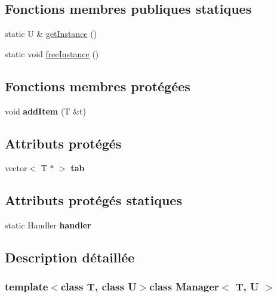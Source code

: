 \subsection*{Fonctions membres publiques statiques}
\begin{DoxyCompactItemize}
\item 
static U \& \hyperlink{class_manager_a8372e4f1e14f3605a57d839b152325ed}{get\+Instance} ()
\item 
static void \hyperlink{class_manager_ada15725fe33d625e2c06dcbe2c5edc4e}{free\+Instance} ()
\end{DoxyCompactItemize}
\subsection*{Fonctions membres protégées}
\begin{DoxyCompactItemize}
\item 
\hypertarget{class_manager_ada69ae9ca42784e98fb81b1fdbcfc6a6}{}void {\bfseries add\+Item} (T \&t)\label{class_manager_ada69ae9ca42784e98fb81b1fdbcfc6a6}

\end{DoxyCompactItemize}
\subsection*{Attributs protégés}
\begin{DoxyCompactItemize}
\item 
\hypertarget{class_manager_abbf456c6a3b97e3a4106316545cbfe69}{}vector$<$ T $\ast$ $>$ {\bfseries tab}\label{class_manager_abbf456c6a3b97e3a4106316545cbfe69}

\end{DoxyCompactItemize}
\subsection*{Attributs protégés statiques}
\begin{DoxyCompactItemize}
\item 
\hypertarget{class_manager_a2b5df0a89665c24f3a01f36ac6f725aa}{}static Handler {\bfseries handler}\label{class_manager_a2b5df0a89665c24f3a01f36ac6f725aa}

\end{DoxyCompactItemize}


\subsection{Description détaillée}
\subsubsection*{template$<$class T, class U$>$class Manager$<$ T, U $>$}

